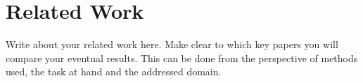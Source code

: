 \section{Related Work}
\label{sec:related_work}
Write about your related work here. Make clear to which key papers you will compare your eventual results. This can be done from the perspective of methods used, the task at hand and the addressed domain.